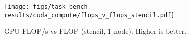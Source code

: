 \begin{figure}[t]
\centering
\texttt{[image: figs/task-bench-results/cuda\_compute/flops\_v\_flops\_stencil.pdf]}
\vspace{-0.5cm}
\caption{GPU FLOP/s vs FLOP (stencil, 1 node). Higher is better.\label{fig:cuda-efficiency}}
\vspace{-0.05cm}
\end{figure}

